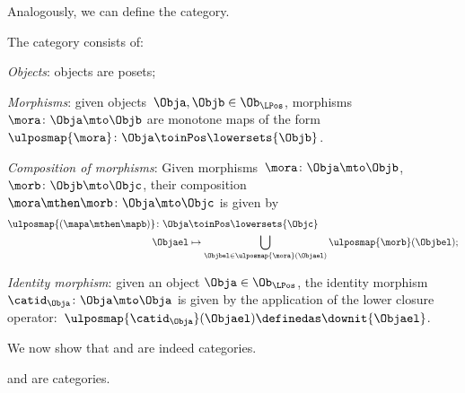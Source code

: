 Analogously, we can define the \LPos category.
\begin{definition}
\label{def:lpos_cat}
The category \LPos consists of:
\begin{compactenum}
    \item \emph{Objects}: objects are posets;
    \item \emph{Morphisms}: given objects~$\Obja,\Objb\in \Ob_{\LPos}$, morphisms~$\mora\colon \Obja\mto \Objb$ are monotone maps of the form~$\ulposmap{\mora} \colon \Obja \toinPos \lowersets{\Objb}$.
    \item \emph{Composition of morphisms}: Given morphisms~$\mora \colon \Obja \mto \Objb$,~$\morb \colon \Objb\mto \Objc$, their composition~$\mora\mthen \morb\colon \Obja\mto \Objc$ is given by
    \begin{equation}
    \begin{aligned}
       \ulposmap{(\mapa \mthen \mapb)} \colon \Obja &\toinPos \lowersets{\Objc}\\
        \Objael&\mapsto \bigcup_{\Objbel\in \ulposmap{\mora} (\Objael)}\ulposmap{\morb}(\Objbel);
    \end{aligned}
    \end{equation}
    \item \emph{Identity morphism}: given an object $\Obja\in \Ob_{\LPos}$, the identity morphism~$\catid_\Obja \colon \Obja \mto \Obja$ is given by the application of the lower closure operator:~$\ulposmap{\catid_\Obja}(\Objael)\definedas \downit\{\Objael\}$.
\end{compactenum}
\end{definition}

We now show that \UPos and \LPos are indeed categories.

\begin{lemma}
\label{lem:upos_lpos_cats}
\UPos and \LPos are categories.
\end{lemma}

